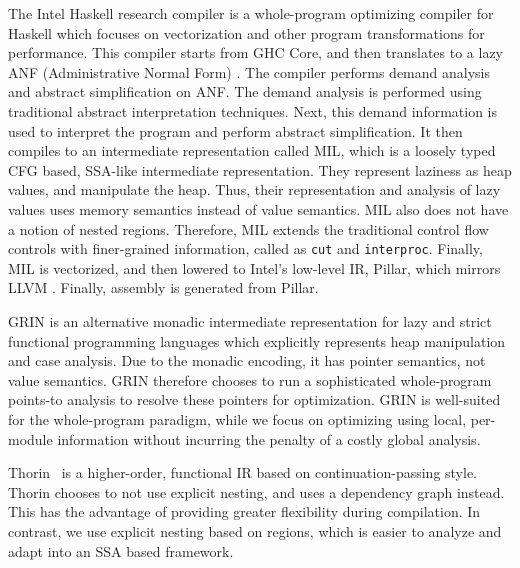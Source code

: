 \documentclass[conference]{IEEEtran}
\begin{document}
The Intel Haskell research compiler \cite{liu2013intel} is a whole-program optimizing
compiler for Haskell which focuses on vectorization and other program transformations for
performance. This compiler starts from GHC Core, and then
translates to a lazy ANF (Administrative Normal Form) \cite{flanagan1993essence}.
The compiler performs demand analysis and abstract simplification on ANF. The
demand analysis is performed using traditional abstract interpretation techniques.
Next, this demand information is used to interpret the program and perform
abstract simplification. It then compiles to an intermediate representation
called MIL, which is a loosely typed CFG based, SSA-like intermediate
representation.  They represent laziness as heap values, and manipulate the
heap. Thus, their representation and analysis of lazy values uses memory semantics
instead of value semantics.  MIL also does not have a notion of
nested regions. Therefore, MIL extends the traditional control flow controls
with finer-grained information, called as \texttt{cut} and
\texttt{interproc}. Finally, MIL is vectorized, and then lowered to
Intel's low-level IR, Pillar, which mirrors LLVM \cite{lattner2004llvm}.
Finally, assembly is generated from Pillar.


GRIN \cite{boquist1996grin} is an alternative monadic intermediate
representation for lazy and strict functional programming languages which
explicitly represents heap manipulation and case analysis. Due to the monadic
encoding, it has pointer semantics, not value semantics. GRIN therefore chooses
to run a sophisticated whole-program points-to analysis to resolve these
pointers for optimization. GRIN is well-suited for the whole-program paradigm,
while we focus on optimizing using local, per-module information without
incurring the penalty of a costly global analysis.

Thorin~\cite{Leia2015AGH} is a higher-order, functional
IR based on continuation-passing style. Thorin chooses to not use
explicit nesting, and uses a dependency graph instead. This has
the advantage of providing greater flexibility during compilation.
In contrast, we use explicit nesting based on regions, which is
easier to analyze and adapt into an SSA based framework.

\end{document}
